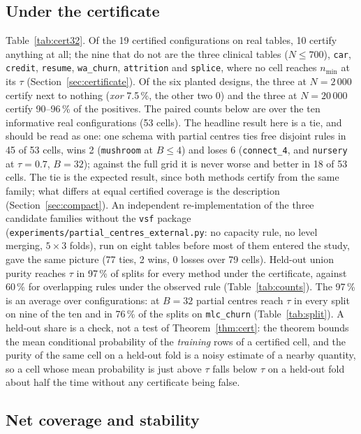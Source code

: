 \documentclass[11pt]{article}
\begin{document}
\subsection{Under the certificate}\label{sec:certified}
Table~\ref{tab:cert32}. Of the 19 certified configurations on real tables, 10 certify anything at all; the nine that do not are the three clinical tables ($N\le700$), \texttt{car}, \texttt{credit}, \texttt{resume}, \texttt{wa\_churn}, \texttt{attrition} and \texttt{splice}, where no cell reaches $n_{\min}$ at its $\tau$ (Section~\ref{sec:certificate}). Of the six planted designs, the three at $N=2\,000$ certify next to nothing (\emph{xor} 7.5\,\%, the other two 0) and the three at $N=20\,000$ certify 90--96\,\% of the positives. The paired counts below are over the ten informative real configurations (53 cells). The headline result here is a tie, and should be read as one: one schema with partial centres ties free disjoint rules in 45 of 53 cells, wins 2 (\texttt{mushroom} at $B\le4$) and loses 6 (\texttt{connect\_4}, and \texttt{nursery} at $\tau=0.7$, $B=32$); against the full grid it is never worse and better in 18 of 53 cells. The tie is the expected result, since both methods certify from the same family; what differs at equal certified coverage is the description (Section~\ref{sec:compact}). An independent re-implementation of the three candidate families without the \texttt{vsf} package (\texttt{experiments/partial\_centres\_external.py}: no capacity rule, no level merging, $5\times3$ folds), run on eight tables before most of them entered the study, gave the same picture (77 ties, 2 wins, 0 losses over 79 cells). Held-out union purity reaches $\tau$ in 97\,\% of splits for every method under the certificate, against 60\,\% for overlapping rules under the observed rule (Table~\ref{tab:counts}). The 97\,\% is an average over configurations: at $B=32$ partial centres reach $\tau$ in every split on nine of the ten and in 76\,\% of the splits on \texttt{mlc\_churn} (Table~\ref{tab:split}). A held-out share is a check, not a test of Theorem~\ref{thm:cert}: the theorem bounds the mean conditional probability of the \emph{training} rows of a certified cell, and the purity of the same cell on a held-out fold is a noisy estimate of a nearby quantity, so a cell whose mean probability is just above $\tau$ falls below $\tau$ on a held-out fold about half the time without any certificate being false.

\subsection{Net coverage and stability}\label{sec:net}
\end{document}

